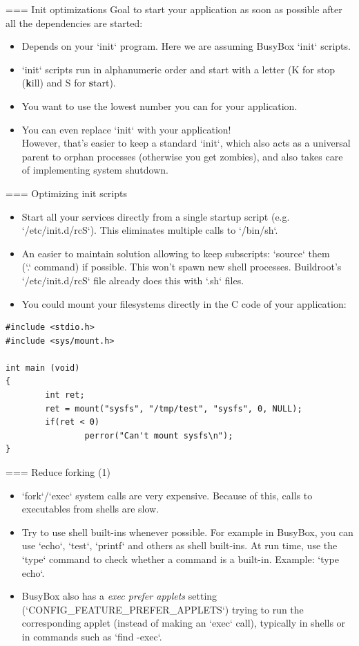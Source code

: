 === Init optimizations Goal to start your application as soon as possible after all the dependencies are started:
\begin{itemize}
	\item Depends on your `init` program. Here we are assuming BusyBox
	      `init` scripts.
	\item `init` scripts run in alphanumeric order and start with
	      a letter (K for stop ({\bf k}ill) and S for {\bf s}tart).
	\item You want to use the lowest number you can for your application.
	\item You can even replace `init` with your application!\\
	      However, that's easier to keep a standard `init`, which also
	      acts as a universal parent to orphan processes (otherwise
	      you get zombies), and also takes care of implementing system shutdown.
\end{itemize}


=== Optimizing init scripts
\begin{itemize}
	\item Start all your services directly from a single startup
	      script (e.g. `/etc/init.d/rcS`). This eliminates multiple
	      calls to `/bin/sh`.
	\item An easier to maintain solution allowing to keep subscripts: `source` them\\
              (`.` command) if possible. This won't spawn new shell
              processes. Buildroot's `/etc/init.d/rcS` file already
              does this with `.sh` files.
	\item You could mount your filesystems directly in the C code
	      of your application:
\end{itemize}
\begin{block}{}
\begin{verbatim}
#include <stdio.h>
#include <sys/mount.h>

int main (void)
{
        int ret;
        ret = mount("sysfs", "/tmp/test", "sysfs", 0, NULL);
        if(ret < 0)
                perror("Can't mount sysfs\n");
}
\end{verbatim}
\end{block}


=== Reduce forking (1)
\begin{itemize}
\item `fork`/`exec` system calls are very expensive.
      Because of this, calls to executables from shells are slow.
\item Try to use shell built-ins whenever possible. For example in
      BusyBox, you can use `echo`, `test`, `printf`
      and others as shell built-ins. At run time, use the `type`
      command to check whether a command is a built-in. Example:
      `type echo`.
\item BusyBox also has a {\em exec prefer applets} setting
      (`CONFIG_FEATURE_PREFER_APPLETS`) trying to run the corresponding
      applet (instead of making an `exec` call), typically in shells
      or in commands such as `find -exec`.
\end{itemize}


